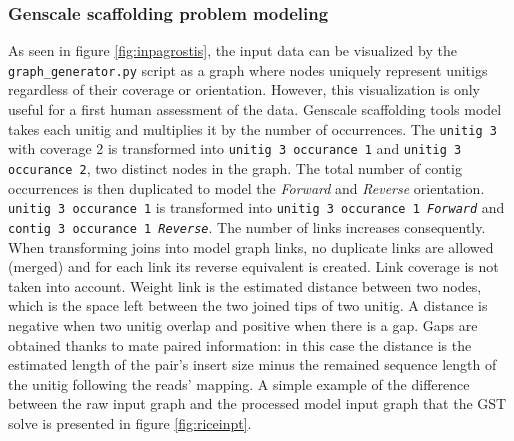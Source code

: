 \documentclass[12pt]{article}
\begin{document}
\subsubsection{Genscale scaffolding problem modeling} \label{sec:gstmodeling}
As seen in figure \ref{fig:inpagrostis}, the input data can be visualized by the \texttt{graph\_generator.py} script as a graph where nodes uniquely represent unitigs regardless of their coverage or orientation. However, this visualization is only useful for a first human assessment of the data. 
Genscale scaffolding tools model takes each unitig and multiplies it by the number of occurrences. The \texttt{unitig 3} with coverage 2 is transformed into \texttt{unitig 3 occurance 1} and \texttt{unitig 3 occurance 2}, two distinct nodes in the graph. The total number of contig occurrences is then duplicated to model the \textit{Forward} and \textit{Reverse} orientation. \texttt{unitig 3 occurance 1} is transformed into \texttt{unitig 3 occurance 1 \textit{Forward}} and \texttt{contig 3 occurance 1 \textit{Reverse}}. The number of links increases consequently. When transforming joins into model graph links, no duplicate links are allowed (merged) and for each link its reverse equivalent is created. Link coverage is not taken into account. Weight link is the estimated distance between two nodes, which is the space left between the two joined tips of two unitig. A distance is negative when two unitig overlap and positive when there is a gap. Gaps are obtained thanks to mate paired information: in this case the distance is the estimated length of the pair's insert size minus the remained sequence length of the unitig following the reads' mapping. A simple example of the difference between the raw input graph and the processed model input graph that the GST solve is presented in figure \ref{fig:riceinpt}.
\end{document}
